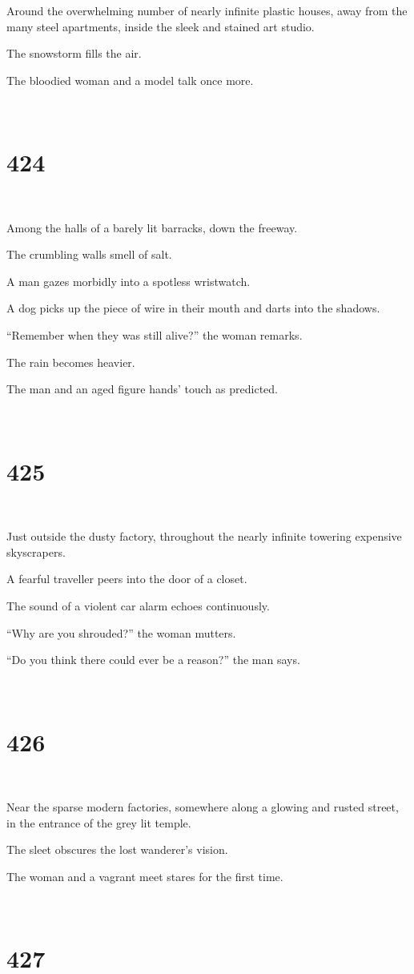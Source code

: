 \documentclass{report}
\begin{document}
Around the overwhelming number of nearly infinite plastic houses, away from the many steel apartments, inside the sleek and stained art studio.

The snowstorm fills the air.

The bloodied woman and a model talk once more.

~
\chapter*{424}
~

Among the halls of a barely lit barracks, down the freeway.

The crumbling walls smell of salt.

A man gazes morbidly into a spotless wristwatch.

A dog picks up the piece of wire in their mouth and darts into the shadows.

``Remember when they was still alive?'' the woman remarks.

The rain becomes heavier.

The man and an aged figure hands' touch as predicted.

~
\chapter*{425}
~

Just outside the dusty factory, throughout the nearly infinite towering expensive skyscrapers.

A fearful traveller peers into the door of a closet.

The sound of a violent car alarm echoes continuously.

``Why are you shrouded?'' the woman mutters.

``Do you think there could ever be a reason?'' the man says.

~
\chapter*{426}
~

Near the sparse modern factories, somewhere along a glowing and rusted street, in the entrance of the grey lit temple.

The sleet obscures the lost wanderer's vision.

The woman and a vagrant meet stares for the first time.

~
\chapter*{427}
~
\end{document}
